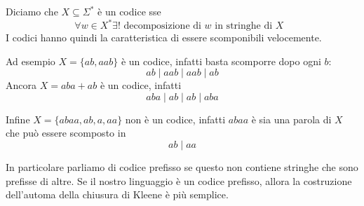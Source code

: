 \documentclass[12pt]{article}
\begin{document}
Diciamo che $X \subseteq \Sigma^*$ è un codice sse
$$ \forall w \in X^* \exists ! \text{ decomposizione di $w$ in stringhe di $X$ } $$
I codici hanno quindi la caratteristica di essere scomponibili velocemente.

\begin{tcolorbox}
	Ad esempio $X = \{ab, aab \} $ è un codice, infatti basta scomporre dopo ogni $b$:
	$$ ab \mid aab \mid aab \mid ab $$
	Ancora $X = aba + ab$ è un codice, infatti
	$$ aba \mid ab \mid ab \mid aba $$

	Infine $X = \{ abaa, ab, a, aa \}$ non è un codice, infatti $abaa$ è sia una parola di $X$ che può essere scomposto in
	$$ ab \mid aa$$
\end{tcolorbox}
In particolare parliamo di codice prefisso se questo non contiene stringhe che sono prefisse di altre.
Se il nostro linguaggio è un codice prefisso, allora la costruzione dell'automa della chiusura di Kleene è più semplice.
\end{document}
